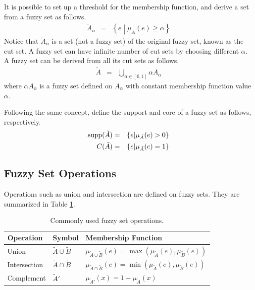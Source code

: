 It is possible to set up a threshold for the membership function, and derive a set from a fuzzy set as follows.
\begin{eqnarray}
	\tilde{A}_\alpha &=& \left\{e \middle| \mu_{\tilde{A}} (e) \geq \alpha \right\} \nonumber
\end{eqnarray} 
Notice that $\tilde{A}_\alpha$ is a set (not a fuzzy set) of the original fuzzy set, known as the cut set. A fuzzy set can have infinite number of cut sets by choosing different $\alpha$. A fuzzy set can be derived from all its cut sets as follows.
\begin{eqnarray}
	\tilde{A} &=& \bigcup_{\alpha \in [0, 1]} \alpha A_\alpha \nonumber
\end{eqnarray} 
where $\alpha A_\alpha$ is a fuzzy set defined on $ A_\alpha$ with constant membership function value $\alpha$.

Following the same concept, define the support and core of a fuzzy set as follows, respectively.
\begin{eqnarray}
	\textup{supp}(\tilde{A}) &=& \left\{ e \middle| \mu_{\tilde{A}}(e) > 0 \right\} \nonumber \\
	C(\tilde{A}) &=& \left\{ e \middle| \mu_{\tilde{A}}(e) = 1 \right\} \nonumber
\end{eqnarray}

\subsection{Fuzzy Set Operations}

Operations such as union and intersection are defined on fuzzy sets. They are summarized in Table \ref{ch:fcs:tab:fuzzysetoperation}.

\begin{table}[h]
	\centering
	\begin{tabular}{lll}
		\hline
		Operation & Symbol & Membership Function \\
		\hline
		Union & $\tilde{A} \cup \tilde{B}$ & $\mu_{\tilde{A} \cup \tilde{B}}(e) = \max(\mu_{\tilde{A}}(e), \mu_{\tilde{B}}(e))$ \\
		Intersection & $\tilde{A} \cap \tilde{B}$ & $\mu_{\tilde{A} \cap \tilde{B}}(e) = \min(\mu_{\tilde{A}}(e), \mu_{\tilde{B}}(e))$ \\
		Complement & $\tilde{A}'$ & $\mu_{\tilde{A}'}(x) = 1 - \mu_{\tilde{A}}(x)$ \\
		\hline
	\end{tabular}
	\caption{Commonly used fuzzy set operations.}
	\label{ch:fcs:tab:fuzzysetoperation}
\end{table}


